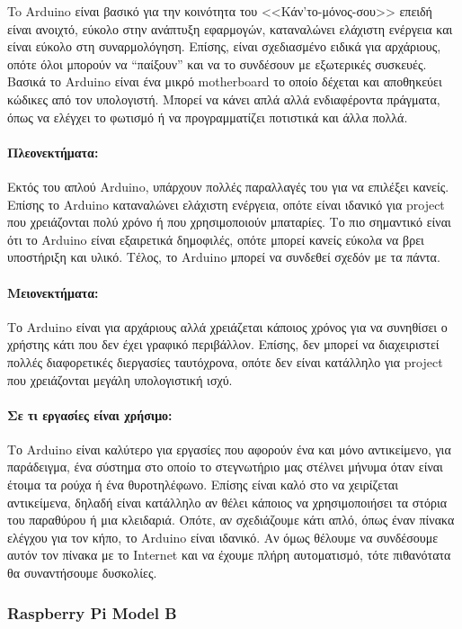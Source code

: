 \documentclass[12pt, a4paper, oneside]{report}
\begin{document}
To Arduino είναι βασικό για την κοινότητα του <<Κάν'το-μόνος-σου>> επειδή είναι ανοιχτό, εύκολο στην ανάπτυξη εφαρμογών, καταναλώνει ελάχιστη ενέργεια και είναι εύκολο στη συναρμολόγηση. Επίσης, είναι σχεδιασμένο ειδικά για αρχάριους, οπότε όλοι μπορούν να ``παίξουν'' και να το συνδέσουν με εξωτερικές συσκευές. Βασικά το Αrduino είναι ένα μικρό motherboard το οποίο δέχεται και αποθηκεύει κώδικες από τον υπολογιστή. Μπορεί να κάνει απλά αλλά ενδιαφέροντα πράγματα, όπως να ελέγχει το φωτισμό ή να προγραμματίζει ποτιστικά και άλλα πολλά.

\paragraph{Πλεονεκτήματα:} Εκτός του απλού Arduino, υπάρχουν πολλές παραλλαγές του για να επιλέξει κανείς. Επίσης το Arduino καταναλώνει ελάχιστη ενέργεια, οπότε είναι ιδανικό για project που χρειάζονται πολύ χρόνο ή που χρησιμοποιούν μπαταρίες. Το πιο σημαντικό είναι ότι το Arduino είναι εξαιρετικά δημοφιλές, οπότε μπορεί κανείς εύκολα να βρει υποστήριξη και υλικό. Τέλος, το Arduino μπορεί να συνδεθεί σχεδόν με τα πάντα.

\paragraph{Μειονεκτήματα:} Το Arduino είναι για αρχάριους αλλά χρειάζεται κάποιος χρόνος για να συνηθίσει ο χρήστης κάτι που δεν έχει γραφικό περιβάλλον. Επίσης, δεν μπορεί να διαχειριστεί πολλές διαφορετικές διεργασίες ταυτόχρονα, οπότε δεν είναι κατάλληλο για project που χρειάζονται μεγάλη υπολογιστική ισχύ.

\paragraph{Σε τι εργασίες είναι χρήσιμο:} Το Arduino είναι καλύτερο για εργασίες που αφορούν ένα και μόνο αντικείμενο, για παράδειγμα, ένα σύστημα στο οποίο το στεγνωτήριο μας στέλνει μήνυμα όταν είναι έτοιμα τα ρούχα ή ένα θυροτηλέφωνο. Επίσης είναι καλό στο να χειρίζεται αντικείμενα, δηλαδή είναι κατάλληλο αν θέλει κάποιος να χρησιμοποιήσει τα στόρια του παραθύρου ή μια κλειδαριά. Οπότε, αν σχεδιάζουμε κάτι απλό, όπως έναν πίνακα ελέγχου για τον κήπο, το Arduino είναι ιδανικό. Αν όμως θέλουμε να συνδέσουμε αυτόν τον πίνακα με το Internet και να έχουμε πλήρη αυτοματισμό, τότε πιθανότατα θα συναντήσουμε δυσκολίες.

\subsubsection{Raspberry Pi Model B}
\end{document}
